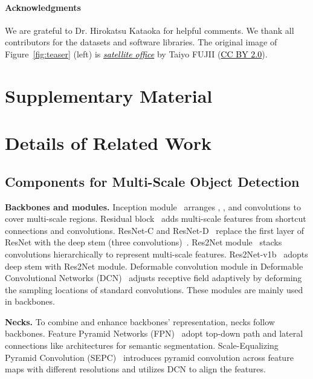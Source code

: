 \documentclass[10pt,twocolumn,letterpaper]{article}
\def\AppendixSection{Supplementary Material\xspace}
\begin{document}
{\small
\paragraph*{Acknowledgments}
We are grateful to Dr. Hirokatsu Kataoka for helpful comments.
We thank all contributors for the datasets and software libraries.
The original image of Figure~\ref{fig:teaser} (left) is
\href{https://www.flickr.com/photos/84326824@N00/428244913}{\textcolor{black}{\textit{satellite office}}} by Taiyo FUJII (\href{https://creativecommons.org/licenses/by/2.0/}{\textcolor{black}{CC BY 2.0}}).
}


{\small


}

\clearpage
\appendix
\section*{\AppendixSection}
\section{Details of Related Work}

\subsection{Components for Multi-Scale Object Detection}

\textbf{Backbones and modules.}
Inception module~\cite{Inception_CVPR2015} arranges , , and  convolutions to cover multi-scale regions.
Residual block~\cite{ResNet_CVPR2016} adds multi-scale features from shortcut connections and  convolutions.
ResNet-C and ResNet-D~\cite{BagOfTricks_Classification_CVPR2019}
replace the first layer of ResNet with the deep stem (three  convolutions)~\cite{Inceptionv3_CVPR2016}.
Res2Net module~\cite{Res2Net_TPAMI2020} stacks  convolutions hierarchically to represent multi-scale features.
Res2Net-v1b~\cite{Res2Net_PretrainedModels} adopts deep stem with Res2Net module.
Deformable convolution module in Deformable Convolutional Networks (DCN)~\cite{DCN_ICCV2017}
adjusts receptive field adaptively
by deforming the sampling locations of standard convolutions.
These modules are mainly used in backbones.

\textbf{Necks.}
To combine and enhance backbones' representation, necks follow backbones.
Feature Pyramid Networks (FPN)~\cite{FPN_CVPR2017}
adopt top-down path and lateral connections like architectures for semantic segmentation.
Scale-Equalizing Pyramid Convolution (SEPC)~\cite{SEPC_CVPR2020}
introduces pyramid convolution across feature maps with different resolutions
and utilizes DCN to align the features.
\end{document}
